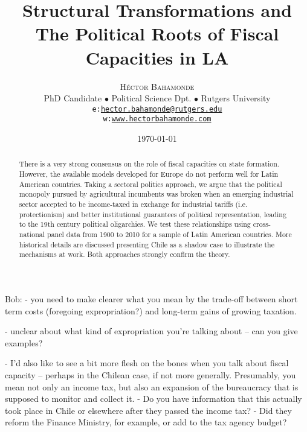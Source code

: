 \documentclass[onesided]{article}\usepackage[]{graphicx}\usepackage[]{color}
\title{\vspace{-15mm}\fontsize{18pt}{7pt}\selectfont\textbf{Structural Transformations and The Political Roots of Fiscal Capacities in LA}} %
\author[1]{
\large
\textsc{H\'ector Bahamonde}\\ 
\normalsize PhD Candidate $\bullet$ Political Science Dpt. $\bullet$ Rutgers University \\
\normalsize \texttt{e:}\href{mailto:hector.bahamonde@rutgers.edu}{\texttt{hector.bahamonde@rutgers.edu}}\\
\normalsize \texttt{w:}\href{http://www.hectorbahamonde.com}{\texttt{www.hectorbahamonde.com}}
\vspace{-5mm}
}
\date{\today}
\begin{document}
\maketitle %

\thispagestyle{fancy} %


\begin{abstract}
There is a very strong consensus on the role of fiscal capacities on state formation. However, the available models developed for Europe do not perform well for Latin American countries. Taking a sectoral politics approach, we argue that the political monopoly pursued by agricultural incumbents was broken when an emerging industrial sector accepted to be income-taxed in exchange for industrial tariffs (i.e. protectionism) and better institutional guarantees of political representation, leading to the 19th century political oligarchies. We test these relationships using cross-national panel data from 1900 to 2010 for a sample of Latin American countries. More historical details are discussed presenting Chile as a shadow case to illustrate the mechanisms at work. Both approaches strongly confirm the theory.
\end{abstract}







\newpage

 Bob: 
 - you need to make clearer what you mean by the trade-off between short term costs (foregoing expropriation?) and long-term gains of growing taxation.  

 - unclear about what kind of expropriation you're talking about -- can you give examples?  

 - I'd also like to see a bit more flesh on the bones when you talk about fiscal capacity -- perhaps in the Chilean case, if not more generally.  Presumably, you mean not only an income tax, but also an expansion of the bureaucracy that is supposed to monitor and collect it.  
 	- Do you have information that this actually took place in Chile or elsewhere after they passed the income tax?  
 	- Did they reform the Finance Ministry, for example, or add to the tax agency budget? 
\end{document}
